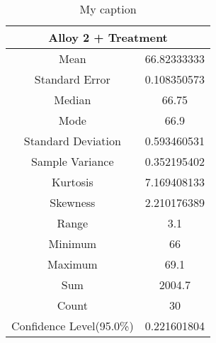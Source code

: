 \documentclass[letterpaper]{article}
\begin{document}
\begin{table}[H]
 \centering
 \begin{tabular}{|c|c|}
  \hline
  \multicolumn{2}{|c|}{Alloy 2 + Treatment} \\ \hline
  Mean                     & 66.82333333    \\ \hline
  Standard Error           & 0.108350573    \\ \hline
  Median                   & 66.75          \\ \hline
  Mode                     & 66.9           \\ \hline
  Standard Deviation       & 0.593460531    \\ \hline
  Sample Variance          & 0.352195402    \\ \hline
  Kurtosis                 & 7.169408133    \\ \hline
  Skewness                 & 2.210176389    \\ \hline
  Range                    & 3.1            \\ \hline
  Minimum                  & 66             \\ \hline
  Maximum                  & 69.1           \\ \hline
  Sum                      & 2004.7         \\ \hline
  Count                    & 30             \\ \hline
  Confidence Level(95.0\%) & 0.221601804    \\ \hline
 \end{tabular}
 \caption{My caption}
 \label{3a3}
\end{table}

\subsection{}%

\subsection{}%

\section{}%

\subsection{}%
\end{document}
